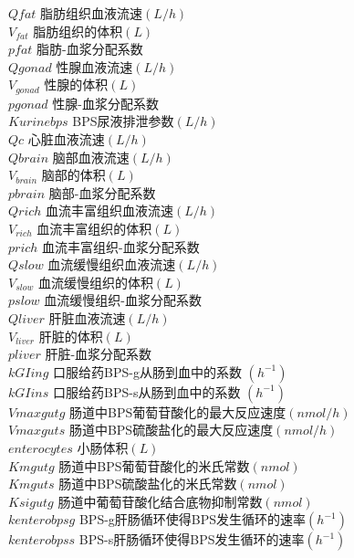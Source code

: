 \documentclass[a4paper,punct=banjiao,twoside]{ctexrep}
\theoremstyle{plain}
\theoremstyle{definition}
\theoremstyle{remark}
\begin{document}
$ Qfat$ {\hfill  脂肪组织血液流速$(L/h) $}\\
$V_{fat}$ {\hfill  脂肪组织的体积$(L)$}\\
$ pfat$ {\hfill  脂肪-血浆分配系数}\\
$ Qgonad$ {\hfill  性腺血液流速$(L/h) $}\\
$V_{gonad}$ {\hfill  性腺的体积$(L)$}\\
$ pgonad$ {\hfill  性腺-血浆分配系数}\\
$ Kurinebps $ {\hfill  BPS尿液排泄参数$(L/h)$}\\
$ Qc$ {\hfill  心脏血液流速$(L/h)$}\\
$ Qbrain$ {\hfill  脑部血液流速$(L/h) $}\\
$V_{brain}$ {\hfill  脑部的体积$(L)$}\\
$ pbrain$ {\hfill  脑部-血浆分配系数}\\
$ Qrich$ {\hfill  血流丰富组织血液流速$(L/h) $}\\
$V_{rich}$ {\hfill  血流丰富组织的体积$(L)$}\\
$ prich$ {\hfill  血流丰富组织-血浆分配系数}\\
$ Qslow$ {\hfill  血流缓慢组织血液流速$(L/h) $}\\
$V_{slow}$ {\hfill  血流缓慢组织的体积$(L)$}\\
$ pslow$ {\hfill  血流缓慢组织-血浆分配系数}\\
$ Qliver$ {\hfill  肝脏血液流速$(L/h) $}\\
$V_{liver}$ {\hfill  肝脏的体积$(L)$}\\
$ pliver$ {\hfill  肝脏-血浆分配系数}\\
$kGIing$ {\hfill 口服给药BPS-g从肠到血中的系数 $(h^{-1})$}\\
$kGIins $ {\hfill  口服给药BPS-s从肠到血中的系数 $(h^{-1})$}\\
$Vmaxgutg$ {\hfill  肠道中BPS葡萄苷酸化的最大反应速度$(nmol/h)$}\\
$Vmaxguts$ {\hfill  肠道中BPS硫酸盐化的最大反应速度$(nmol/h)$}\\
$enterocytes $ {\hfill  小肠体积$(L)$}\\
$ Kmgutg$ {\hfill  肠道中BPS葡萄苷酸化的米氏常数$(nmol)$}\\
$ Kmguts$ {\hfill  肠道中BPS硫酸盐化的米氏常数$(nmol)$}\\
$ Ksigutg$ {\hfill  肠道中葡萄苷酸化结合底物抑制常数$(nmol)$}\\
$ kenterobpsg$ {\hfill  BPS-g肝肠循环使得BPS发生循环的速率$(h^{-1})$}\\
$ kenterobpss$ {\hfill  BPS-s肝肠循环使得BPS发生循环的速率$(h^{-1})$}\\
\end{document}
